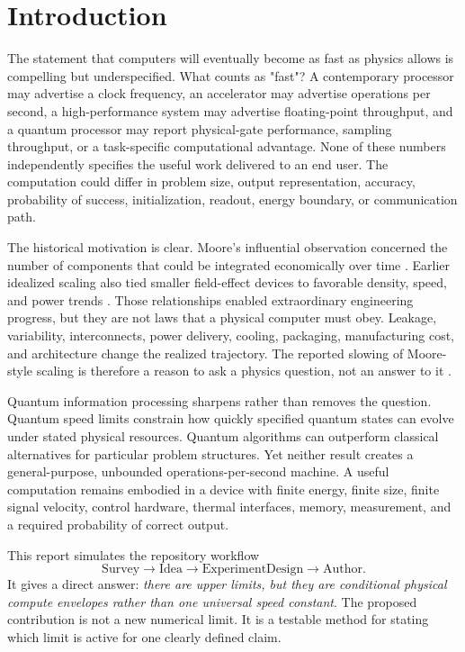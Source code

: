 \documentclass[conference]{IEEEtran}
\begin{document}
\section{Introduction}

The statement that computers will eventually become as fast as physics allows
is compelling but underspecified. What counts as "fast"? A contemporary
processor may advertise a clock frequency, an accelerator may advertise
operations per second, a high-performance system may advertise floating-point
throughput, and a quantum processor may report physical-gate performance,
sampling throughput, or a task-specific computational advantage. None of
these numbers independently specifies the useful work delivered to an end
user. The computation could differ in problem size, output representation,
accuracy, probability of success, initialization, readout, energy boundary,
or communication path.

The historical motivation is clear. Moore's influential observation concerned
the number of components that could be integrated economically over time
\cite{moore}. Earlier idealized scaling also tied smaller field-effect devices
to favorable density, speed, and power trends \cite{dennard}. Those
relationships enabled extraordinary engineering progress, but they are not
laws that a physical computer must obey. Leakage, variability, interconnects,
power delivery, cooling, packaging, manufacturing cost, and architecture
change the realized trajectory. The reported slowing of Moore-style scaling is
therefore a reason to ask a physics question, not an answer to it
\cite{waldrop}.

Quantum information processing sharpens rather than removes the question.
Quantum speed limits constrain how quickly specified quantum states can
evolve under stated physical resources. Quantum algorithms can outperform
classical alternatives for particular problem structures. Yet neither result
creates a general-purpose, unbounded operations-per-second machine. A useful
computation remains embodied in a device with finite energy, finite size,
finite signal velocity, control hardware, thermal interfaces, memory,
measurement, and a required probability of correct output.

This report simulates the repository workflow
\begin{equation}
\text{Survey} \longrightarrow \text{Idea} \longrightarrow
\text{ExperimentDesign} \longrightarrow \text{Author}.
\label{eq:workflow}
\end{equation}
It gives a direct answer: \emph{there are upper limits, but they are
conditional physical compute envelopes rather than one universal speed
constant}. The proposed contribution is not a new numerical limit. It is a
testable method for stating which limit is active for one clearly defined
claim.
\end{document}
